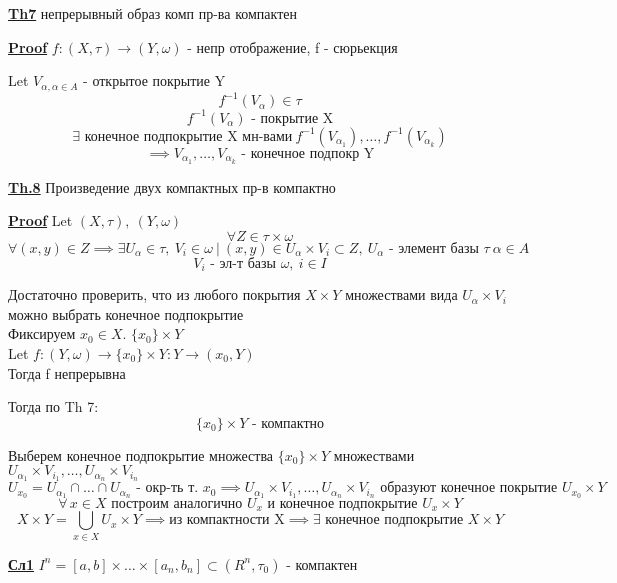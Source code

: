 \documentclass[a4paper]{article}
\begin{document}
\begin{tcolorbox}
\textbf{\underline{Th7}} непрерывный образ комп пр-ва компактен

\textbf{\underline{Proof}} $ f: (X,\tau) \to (Y, \omega) $ - непр отображение, f - сюрьекция 

Let $ V_{\alpha, \alpha \in A} $ - открытое покрытие Y
\[
    f^{-1}(V_\alpha) \in \tau
\]
\[
    f^{-1}(V_\alpha) \text{ - покрытие X}
\]
\[
    \exists \text{ конечное подпокрытие X мн-вами} \ f^{-1}(V_{\alpha_1}), \dots
    , f^{-1}(V_{\alpha_k})
\]
\[
    \implies V_{\alpha_1}, \dots, V_{\alpha_k} \text{ - конечное подпокр Y}
\]
\end{tcolorbox}

\begin{tcolorbox}
\textbf{\underline{Th.8}} Произведение двух компактных пр-в компактно

\textbf{\underline{Proof}} Let $ (X, \tau), \ (Y, \omega) $ 
\[
    \forall Z \in \tau \times \omega
\]
\[
    \forall(x,y) \in Z \implies \exists U_\alpha \in \tau, \ V_i \in \omega \ | \ 
    (x,y) \in U_\alpha \times V_i \subset Z, \ U_\alpha \text{ - элемент базы }\tau
    \ \alpha \in A
\]
\[
    V_i \text{ - эл-т базы }\omega, \ i \in I
\]

Достаточно проверить, что из любого покрытия $ X \times Y $ множествами вида 
$ U_\alpha \times V_i $ можно выбрать конечное подпокрытие\\
Фиксируем $ x_0 \in X $. $ \{ x_0 \} \times Y $ \\
Let $ f: (Y, \omega) \to \{x_0 \} \times Y: Y \to (x_0, Y) $ \\
Тогда f непрерывна

Тогда по Th 7:
\[
    \{ x_0 \} \times Y \text{ - компактно}
\]

Выберем конечное подпокрытие множества $ \{ x_0 \} \times Y $ множествами
$ U_{\alpha_1} \times V_{i_1}, \dots, U_{\alpha_n}\times V_{i_n} $ 
\[
    U_{x_0} = U_{\alpha_1} \cap \dots \cap U_{\alpha_n} \text{ - окр-ть т. } x_0
    \implies  U_{\alpha_1} \times V_{i_1}, \dots, U_{\alpha_n}\times V_{i_n} 
    \text{ образуют конечное покрытие } U_{x_0} \times Y
\]
\[
    \forall \, x \in X \text{ построим аналогично } U_x \text{ и конечное подпокрытие }
    U_x \times Y
\]
\[
    X \times Y = \bigcup_{x \in X} U_x \times Y \implies \text{из компактности X}
    \implies \exists \text{ конечное подпокрытие } X \times Y
\]

\textbf{\underline{Сл1}} $ I^{n} = [a,b] \times \dots \times [a_n, b_n] \subset (R^{n}, \tau_0) $ 
- компактен
\end{tcolorbox}
\end{document}
